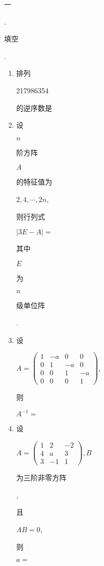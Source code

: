 \documentclass[10pt]{article}
\begin{document}
\begin{CJK}{UTF8}{mj}一\end{CJK}. \begin{CJK}{UTF8}{mj}填空\end{CJK}.

\begin{enumerate}
  \item \begin{CJK}{UTF8}{mj}排列\end{CJK} 217986354 \begin{CJK}{UTF8}{mj}的逆序数是\end{CJK}

  \item \begin{CJK}{UTF8}{mj}设\end{CJK} $n$ \begin{CJK}{UTF8}{mj}阶方阵\end{CJK} $A$ \begin{CJK}{UTF8}{mj}的特征值为\end{CJK} $2,4, \cdots, 2 n$, \begin{CJK}{UTF8}{mj}则行列式\end{CJK} $|3 E-A|=$ \begin{CJK}{UTF8}{mj}其中\end{CJK} $E$ \begin{CJK}{UTF8}{mj}为\end{CJK} $n$ \begin{CJK}{UTF8}{mj}级单位阵\end{CJK}.

  \item \begin{CJK}{UTF8}{mj}设\end{CJK} $A=\left(\begin{array}{cccc}1 & -a & 0 & 0 \\ 0 & 1 & -a & 0 \\ 0 & 0 & 1 & -a \\ 0 & 0 & 0 & 1\end{array}\right)$, \begin{CJK}{UTF8}{mj}则\end{CJK} $A^{-1}=$

  \item \begin{CJK}{UTF8}{mj}设\end{CJK} $A=\left(\begin{array}{ccc}1 & 2 & -2 \\ 4 & a & 3 \\ 3 & -1 & 1\end{array}\right), B$ \begin{CJK}{UTF8}{mj}为三阶非零方阵\end{CJK}, \begin{CJK}{UTF8}{mj}且\end{CJK} $A B=0$, \begin{CJK}{UTF8}{mj}则\end{CJK} $a=$


\end{enumerate}
\end{document}
